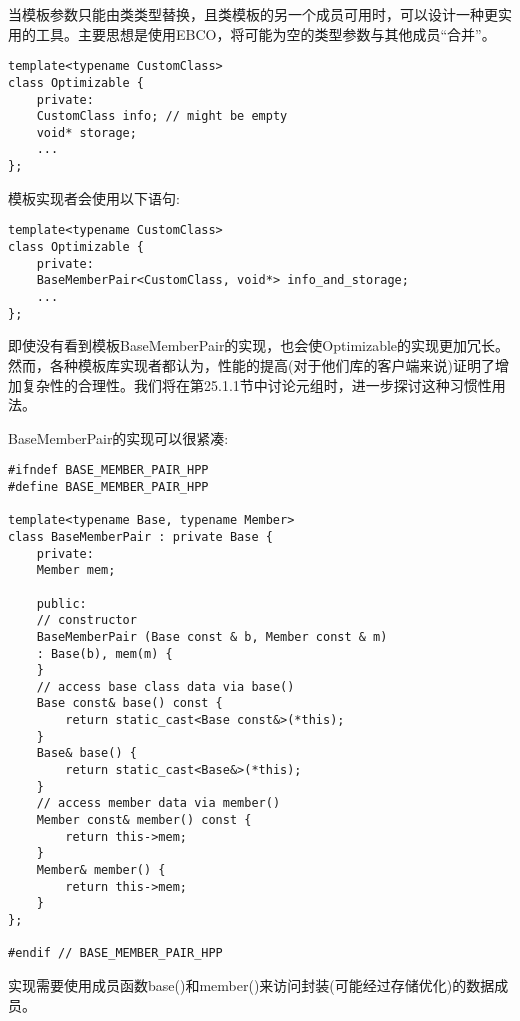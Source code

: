 当模板参数只能由类类型替换，且类模板的另一个成员可用时，可以设计一种更实用的工具。主要思想是使用EBCO，将可能为空的类型参数与其他成员“合并”。

\begin{lstlisting}[style=styleCXX]
template<typename CustomClass>
class Optimizable {
	private:
	CustomClass info; // might be empty
	void* storage;
	...
};
\end{lstlisting}

模板实现者会使用以下语句:

\begin{lstlisting}[style=styleCXX]
template<typename CustomClass>
class Optimizable {
	private:
	BaseMemberPair<CustomClass, void*> info_and_storage;
	...
};
\end{lstlisting}

即使没有看到模板BaseMemberPair的实现，也会使Optimizable的实现更加冗长。然而，各种模板库实现者都认为，性能的提高(对于他们库的客户端来说)证明了增加复杂性的合理性。我们将在第25.1.1节中讨论元组时，进一步探讨这种习惯性用法。

BaseMemberPair的实现可以很紧凑:

\begin{lstlisting}[style=styleCXX]
#ifndef BASE_MEMBER_PAIR_HPP
#define BASE_MEMBER_PAIR_HPP

template<typename Base, typename Member>
class BaseMemberPair : private Base {
	private:
	Member mem;
	
	public:
	// constructor
	BaseMemberPair (Base const & b, Member const & m)
	: Base(b), mem(m) {
	}
	// access base class data via base()
	Base const& base() const {
		return static_cast<Base const&>(*this);
	}
	Base& base() {
		return static_cast<Base&>(*this);
	}
	// access member data via member()
	Member const& member() const {
		return this->mem;
	}
	Member& member() {
		return this->mem;
	}
};

#endif // BASE_MEMBER_PAIR_HPP
\end{lstlisting}

实现需要使用成员函数base()和member()来访问封装(可能经过存储优化)的数据成员。





























